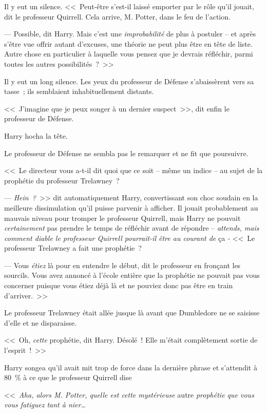Il y eut un silence. <<~Peut-être s'est-il laissé emporter par le rôle qu'il jouait, dit le professeur Quirrell. Cela arrive, M. Potter, dans le feu de l'action.

--- Possible, dit Harry. Mais c'est une \emph{improbabilité} de plus à postuler -- et après s'être vue offrir autant d'excuses, une théorie ne peut plus être en tête de liste. Autre chose en particulier à laquelle vous pensez que je devrais réfléchir, parmi toutes les autres possibilités~?~>>

Il y eut un long silence. Les yeux du professeur de Défense s'abaissèrent vers sa tasse~; ils semblaient inhabituellement distants.

<<~J'imagine que je peux songer à un dernier suspect~>>, dit enfin le professeur de Défense.

Harry hocha la tête.

Le professeur de Défense ne sembla pas le remarquer et ne fit que poursuivre.

<<~Le directeur vous a-t-il dit quoi que ce soit -- même un indice -- au sujet de la prophétie du professeur Trelawney~?

--- \emph{Hein~?}~>> dit automatiquement Harry, convertissant son choc soudain en la meilleure dissimulation qu'il puisse parvenir à afficher. Il jouait probablement au mauvais niveau pour tromper le professeur Quirrell, mais Harry ne pouvait \emph{certainement} pas prendre le temps de réfléchir avant de répondre -- \emph{attends, mais comment diable le professeur Quirrell pourrait-il être au courant de} ça \emph{-} <<~Le professeur Trelawney a fait une prophétie~?

--- Vous \emph{étiez} là pour en entendre le début, dit le professeur en fronçant les sourcils. Vous avez annoncé à l'école entière que la prophétie ne pouvait pas vous concerner puisque vous étiez déjà là et ne pouviez donc pas être en train d'arriver.~>>


Le professeur Trelawney était allée jusque là avant que Dumbledore ne se saisisse d'elle et ne disparaisse.

<<~Oh, \emph{cette} prophétie, dit Harry. Désolé~! Elle m'était complètement sortie de l'esprit~!~>>

Harry songea qu'il avait mit trop de force dans la dernière phrase et s'attendit à 80~\% à ce que le professeur Quirrell dise

<<~\emph{Aha, alors M. Potter, quelle est cette mystérieuse} autre \emph{prophétie que vous vous fatiguez tant à nier…}

